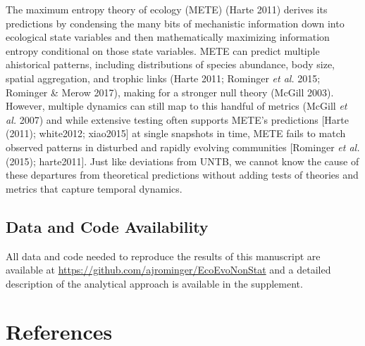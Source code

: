 \documentclass[
]{article}
\begin{document}
The maximum entropy theory of ecology (METE) (Harte 2011) derives its
predictions by condensing the many bits of mechanistic information down
into ecological state variables and then mathematically maximizing
information entropy conditional on those state variables. METE can
predict multiple ahistorical patterns, including distributions of
species abundance, body size, spatial aggregation, and trophic links
(Harte 2011; Rominger \emph{et al.} 2015; Rominger \& Merow 2017),
making for a stronger null theory (McGill 2003). However, multiple
dynamics can still map to this handful of metrics (McGill \emph{et al.}
2007) and while extensive testing often supports METE's predictions
{[}Harte (2011); white2012; xiao2015{]} at single snapshots in time,
METE fails to match observed patterns in disturbed and rapidly evolving
communities {[}Rominger \emph{et al.} (2015); harte2011{]}. Just like
deviations from UNTB, we cannot know the cause of these departures from
theoretical predictions without adding tests of theories and metrics
that capture temporal dynamics.

\hypertarget{data-and-code-availability}{%
\subsection{Data and Code
Availability}\label{data-and-code-availability}}

All data and code needed to reproduce the results of this manuscript are
available at \url{https://github.com/ajrominger/EcoEvoNonStat} and a
detailed description of the analytical approach is available in the
supplement.

\clearpage

\hypertarget{references}{%
\section*{References}\label{references}}
\end{document}
